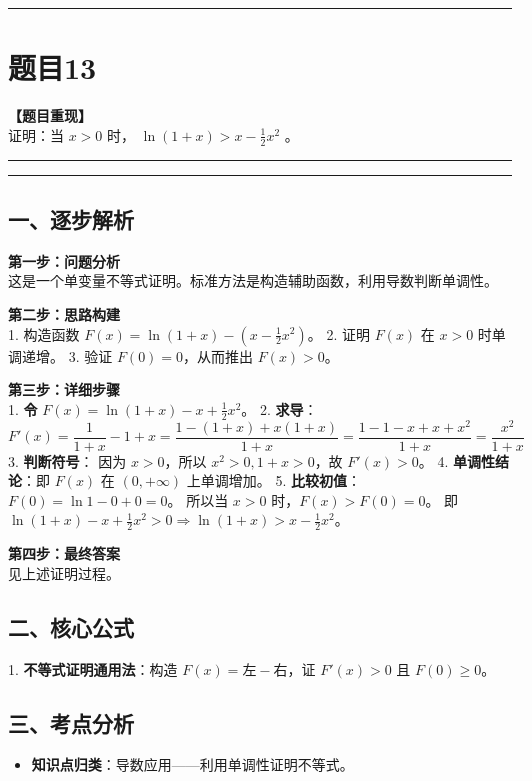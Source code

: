\documentclass[12pt, a4paper]{ctexart}
\newcommand{\TopSeparator}{
    \par\noindent\rule{\textwidth}{1.5pt}\vspace{0.5em} %
}
\newcommand{\AnalysisSeparator}{
    \par\noindent\rule{\textwidth}{0.5pt}\vspace{0.2em}\hrule\vspace{0.5em} %
}
\newenvironment{RedAnalysis}{
    \par
    \color{red} %
}{
    \par
    \color{black} %
}
\begin{document}
\vspace{2em}

\TopSeparator
\section*{题目13}

\textbf{【题目重现】} \\
证明：当 $x>0$ 时， $ \ln(1+x)>x-\frac{1}{2}x^{2} $ 。

\AnalysisSeparator

\begin{RedAnalysis}

\subsection*{一、逐步解析}

\textbf{第一步：问题分析} \\
这是一个单变量不等式证明。标准方法是构造辅助函数，利用导数判断单调性。

\textbf{第二步：思路构建} \\
1. 构造函数 $F(x) = \ln(1+x) - (x - \frac{1}{2}x^2)$。
2. 证明 $F(x)$ 在 $x>0$ 时单调递增。
3. 验证 $F(0) = 0$，从而推出 $F(x) > 0$。

\textbf{第三步：详细步骤} \\
1. \textbf{令} $F(x) = \ln(1+x) - x + \frac{1}{2}x^2$。
2. \textbf{求导}：
   \[ F'(x) = \frac{1}{1+x} - 1 + x = \frac{1 - (1+x) + x(1+x)}{1+x} = \frac{1-1-x+x+x^2}{1+x} = \frac{x^2}{1+x} \]
3. \textbf{判断符号}：
   因为 $x>0$，所以 $x^2 > 0, 1+x > 0$，故 $F'(x) > 0$。
4. \textbf{单调性结论}：即 $F(x)$ 在 $(0, +\infty)$ 上单调增加。
5. \textbf{比较初值}：$F(0) = \ln 1 - 0 + 0 = 0$。
   所以当 $x>0$ 时，$F(x) > F(0) = 0$。
   即 $\ln(1+x) - x + \frac{1}{2}x^2 > 0 \Rightarrow \ln(1+x) > x - \frac{1}{2}x^2$。

\textbf{第四步：最终答案} \\
见上述证明过程。

\subsection*{二、核心公式}
1. \textbf{不等式证明通用法}：构造 $F(x) = \text{左} - \text{右}$，证 $F'(x)>0$ 且 $F(0) \ge 0$。

\subsection*{三、考点分析}
\begin{itemize}
    \item \textbf{知识点归类}：导数应用——利用单调性证明不等式。
\end{itemize}

\end{RedAnalysis}
\end{document}
